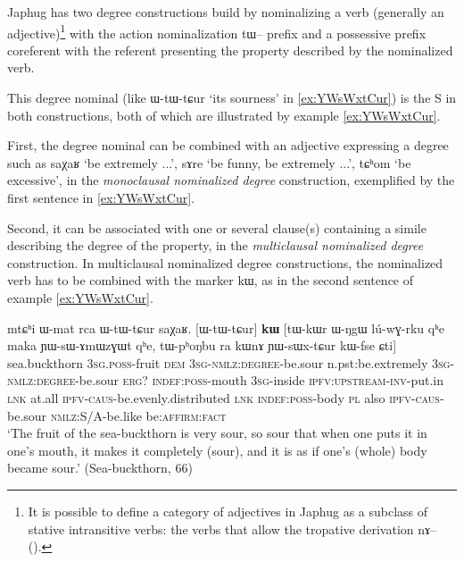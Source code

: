 \documentclass[oldfontcommands,oneside,a4paper,11pt]{article}
\newcommand{\ipa}[1]{{\phon #1}} %
\begin{document}
 
Japhug has two degree constructions build by nominalizing a verb (generally an adjective)\footnote{It is possible to define a category of adjectives in Japhug as a subclass of stative intransitive verbs: the verbs that allow the tropative derivation \ipa{nɤ--} (\citealt{jacques13tropative}).}  with the action nominalization \ipa{tɯ--} prefix and a possessive prefix coreferent with the referent presenting the property described by the nominalized verb. 

This degree nominal (like \ipa{ɯ-tɯ-tɕur} `its sourness' in \ref{ex:YWsWxtCur}) is the S in both constructions,  both of which are illustrated by example \ref{ex:YWsWxtCur}. 

First, the degree nominal can be  combined with an adjective expressing a degree such as \ipa{saχaʁ} `be extremely ...', \ipa{sɤre} `be funny, be extremely ...', \ipa{tɕʰom} `be excessive', in the \textit{monoclausal nominalized degree} construction, exemplified by the first sentence in \ref{ex:YWsWxtCur}.

Second, it can be associated  with one or several  clause(s) containing a simile describing the degree of the property, in the \textit{multiclausal nominalized degree} construction. In multiclausal nominalized degree constructions, the nominalized verb has to be combined with the marker \ipa{kɯ}, as in the second sentence of example \ref{ex:YWsWxtCur}.




\begin{exe}
\ex \label{ex:YWsWxtCur}
\gll 
\ipa{mtɕʰi}  	\ipa{ɯ-mat}  	\ipa{rca}  	\ipa{ɯ-tɯ-tɕur}  	\ipa{saχaʁ.}  	[\ipa{ɯ-tɯ-tɕur}]  	\ipa{\textbf{kɯ}}  	[\ipa{tɯ-kɯr}  	\ipa{ɯ-ŋgɯ}  	\ipa{lú-wɣ-rku}  	\ipa{qʰe}  	\ipa{maka}  	\ipa{ɲɯ-sɯ-ɤmɯzɣɯt}  	\ipa{qʰe,}  	\ipa{tɯ-pʰoŋbu}  	\ipa{ra}  	\ipa{kɯnɤ}  	\ipa{ɲɯ-sɯx-tɕur}  	\ipa{kɯ-fse}  	\ipa{ɕti}]  \\
sea.buckthorn \textsc{3sg.poss}-fruit \textsc{dem} \textsc{3sg-nmlz:degree}-be.sour n.pst:be.extremely \textsc{3sg-nmlz:degree}-be.sour \textsc{erg?} \textsc{indef:poss}-mouth \textsc{3sg}-inside \textsc{ipfv:upstream-inv}-put.in \textsc{lnk} at.all \textsc{ipfv-caus}-be.evenly.distributed \textsc{lnk} \textsc{indef:poss}-body \textsc{pl} also \textsc{ipfv-caus}-be.sour \textsc{nmlz:S/A}-be.like be:\textsc{affirm}:\textsc{fact} \\
\glt `The fruit of the sea-buckthorn is very sour, so sour that when one puts it in one's mouth, it makes it completely (sour), and it is as if one's (whole) body became sour.' (Sea-buckthorn, 66)
\end{exe}
\end{document}
